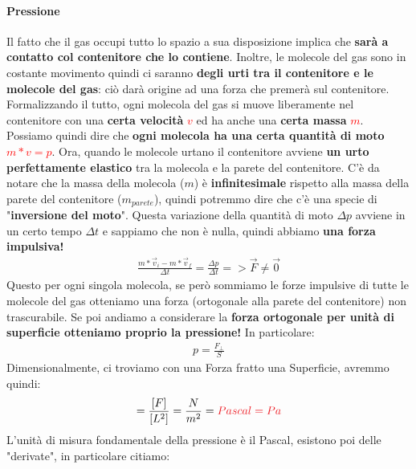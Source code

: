             \paragraph{Pressione}
                Il fatto che il gas occupi tutto lo spazio a sua disposizione implica che \textbf{sarà a contatto col contenitore che lo contiene}. Inoltre, le molecole del gas sono in costante movimento quindi ci saranno \textbf{degli urti tra il contenitore e le molecole del gas}: ciò darà origine ad una forza che premerà sul contenitore.
                Formalizzando il tutto, ogni molecola del gas si muove liberamente nel contenitore con una \textbf{certa velocità} \textcolor{Red}{$v$} ed ha anche una \textbf{certa massa} \textcolor{Red}{$m$}. Possiamo quindi dire che \textbf{ogni molecola ha una certa quantità di moto} \textcolor{Red}{$m*v = p$}. Ora, quando le molecole urtano il contenitore avviene \textbf{un urto perfettamente elastico} tra la molecola e la parete del contenitore. C'è da notare che la massa della molecola ($m$) è \textbf{infinitesimale} rispetto alla massa della parete del contenitore ($m_{parete}$), quindi potremmo dire che c'è una specie di "\textbf{inversione del moto}". Questa variazione della quantità di moto $\Delta p$ avviene in un certo tempo $\Delta t$ e sappiamo che non è nulla, quindi abbiamo \textbf{una forza impulsiva!}
                \begin{align*}
                    \frac{m*\vec{v}_i - m*\vec{v}_f}{\Delta t} = \frac{\Delta p}{\Delta t} => \vec{F}\neq \vec{0}
                \end{align*}
                Questo per ogni singola molecola, se però sommiamo le forze impulsive di tutte le molecole del gas otteniamo una forza (ortogonale alla parete del contenitore) non trascurabile. Se poi andiamo a considerare la \textbf{forza ortogonale per unità di superficie otteniamo proprio la pressione!} In particolare:
                \begin{align*}
                    p = \frac{F_\bot}{S}
                \end{align*}
                Dimensionalmente, ci troviamo con una Forza fratto una Superficie, avremmo quindi:
                \begin{align*}
                    [p]=\frac{[F]}{[L^2]}=\frac{N}{m^2}=\textcolor{Red}{Pascal=Pa}
                \end{align*}
                L'unità di misura fondamentale della pressione è il Pascal, esistono poi delle "derivate", in particolare citiamo:
